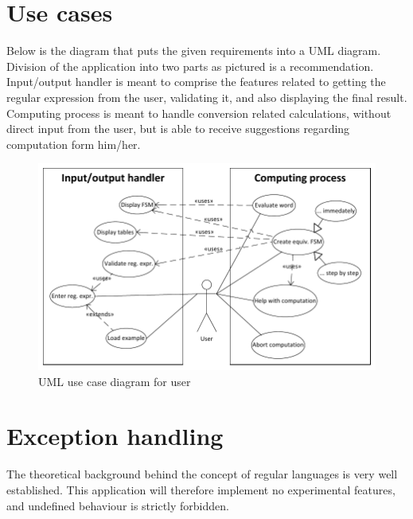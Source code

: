 \documentclass{article}
\begin{document}


\section{Use cases}

Below is the diagram that puts the given requirements into a UML diagram. Division of the
application into two parts as pictured is a recommendation. Input/output handler is meant to
comprise the features related to getting the regular expression from the user, validating it, and
also displaying the final result. Computing process is meant to handle conversion related
calculations, without direct input from the user, but is able to receive suggestions regarding
computation form him/her.

\begin{figure}[ht!]
  \centering
  \includegraphics[width=\textwidth]{../../use_case/use_cases.pdf}
  \caption{UML use case diagram for \titletext{} user}
\end{figure}

\section{Exception handling}
The theoretical background behind the concept of regular languages is very well established. This
application will therefore implement no experimental features, and undefined behaviour is strictly
forbidden.
\end{document}
